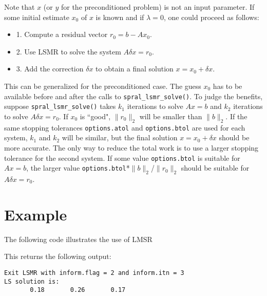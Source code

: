      Note that $x$ (or $y$ for the preconditioned problem) is not an input
     parameter.
     If some initial estimate $x_0$ of $x$ is known and if $\lambda = 0$,
     one could proceed as follows:
    \begin{itemize} 
     \item 1. Compute a residual vector     $r_0 = b - Ax_0$.
    \item 2. Use LSMR to solve the system  $A \delta x = r_0$.
    \item 3. Add the correction $\delta x$ to obtain a final solution $x = x_0 + \delta x$.
    \end{itemize}
     This can be generalized for the preconditioned case.
     The guess $x_0$ has to be available before and after the calls
     to {\tt spral\_lsmr\_solve()}.  To judge the benefits, suppose {\tt spral\_lsmr\_solve()} takes $k_1$ iterations
     to solve $Ax = b$ and $k_2$ iterations to solve $A \delta x = r_0$.
     If $x_0$ is ``good", $\|r_0\|_2$ will be smaller than $\|b\|_2$.
     If the same stopping tolerances {\tt options.atol} and {\tt options.btol}
      are used for each
     system, $k_1$ and $k_2$ will be similar, but the final solution $x = x_0 + \delta x$
     should be more accurate.  The only way to reduce the total work
     is to use a larger stopping tolerance for the second system.
     If some value {\tt options.btol} is suitable for $Ax=b$, the larger value
     {\tt options.btol}*$\|b\|_2$/$\|r_0\|_2$  should be suitable for $A \delta x = r_0$.
    




\section{Example}
The following code illustrates the use of LMSR



This returns the following output:

\begin{verbatim}
Exit LSMR with inform.flag = 2 and inform.itn = 3
LS solution is:
       0.18       0.26       0.17
\end{verbatim}

\begin{funders}
\end{funders}
